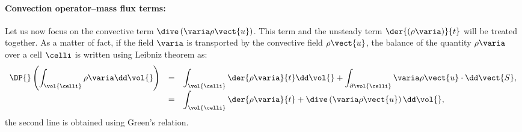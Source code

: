 \paragraph{Convection operator--mass flux terms:}
 Let us now focus on the convective term $\dive \left( \varia \rho \vect{u}\right)$. This term and the
 unsteady term $ \der{ \left( \rho \varia \right) }{ t} $ will be treated
 together. As a matter of fact, if the field $\varia$ is transported by the convective field $\rho \vect{u}$, the balance
 of the quantity $\rho \varia$ over a cell $\celli$ is written using Leibniz theorem as:
 \begin{equation}\label{eq:spadis:leibnitz_th}
\begin{array}{r c l}
\displaystyle \DP{} \left( \int_{\vol{\celli}} \rho \varia \dd \vol{}\right) &=&
\displaystyle \int_{\vol{\celli}} \der{\rho \varia}{t} \dd \vol{} + \int_{\partial \vol{\celli}} \varia \rho \vect{u} \cdot  \dd \vect{S}, \\
\displaystyle &=&
\displaystyle \int_{\vol{\celli}} \der{\rho \varia}{t} + \dive \left( \varia \rho \vect{u} \right)  \dd \vol{},
\end{array}
 \end{equation}
the second line is obtained using Green's relation.

